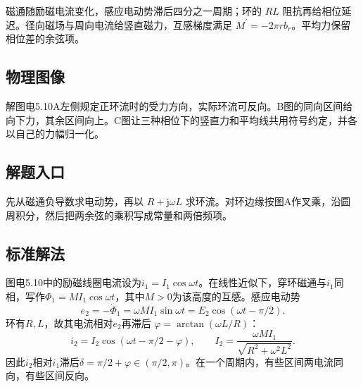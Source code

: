 \documentclass[UTF8,fontset=fandol,a4paper,11pt]{ctexart}
\begin{document}
磁通随励磁电流变化，感应电动势滞后四分之一周期；环的 $RL$ 阻抗再给相位延迟。径向磁场与周向电流给竖直磁力，互感梯度满足 $M^{\prime}=-2\pi r b_r$。平均力保留相位差的余弦项。



\subsection*{物理图像}

解图电5.10A左侧规定正环流时的受力方向，实际环流可反向。B图的同向区间给向下力，其余区间向上。C图让三种相位下的竖直力和平均线共用符号约定，并各以自己的力幅归一化。



\subsection*{解题入口}

先从磁通负导数求电动势，再以 $R+\mathrm j\omega L$ 求环流。对环边缘按图A作叉乘，沿圆周积分，然后把两余弦的乘积写成常量和两倍频项。


\subsection*{标准解法}


图电5.10中的励磁线圈电流设为$i_1=I_1\cos\omega t$。在线性近似下，穿环磁通与$i_1$同相，写作$\Phi_1=M I_1\cos\omega t$，其中$M>0$为该高度的互感。感应电动势
\[
 e_2=-\dot\Phi_1=\omega M I_1\sin\omega t
 =E_2\cos(\omega t-\pi/2).
\]
环有$R,L$，故其电流相对$e_2$再滞后
$\varphi=\arctan(\omega L/R)$：
\[
 i_2=I_2\cos(\omega t-\pi/2-\varphi),\qquad
 I_2=\frac{\omega M I_1}{\sqrt{R^2+\omega^2L^2}}.
\]
因此$i_2$相对$i_1$滞后$\delta=\pi/2+\varphi\in(\pi/2,\pi)$。在一个周期内，有些区间两电流同向，有些区间反向。
\end{document}
